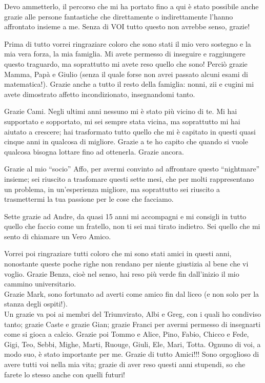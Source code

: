 
Devo ammetterlo, il percorso che mi ha portato fino a qui è stato possibile anche grazie alle persone fantastiche che direttamente o indirettamente l'hanno affrontato insieme a me. Senza di VOI tutto questo non avrebbe senso, grazie!

Prima di tutto vorrei ringraziare coloro che sono stati il mio vero sostegno e la mia vera forza, la mia famiglia. Mi avete permesso di inseguire e raggiungere questo traguardo, ma soprattutto mi avete reso quello che sono! Perciò grazie 
Mamma, Papà e Giulio (senza il quale forse non avrei passato alcuni esami di matematica!). Grazie anche a tutto il resto della famiglia: nonni, zii e cugini mi avete dimostrato affetto incondizionato, insegnandomi tanto.

Grazie Cami. Negli ultimi anni nessuno mi è stato più vicino di te. Mi hai supportato e sopportato, mi sei sempre stata vicina, ma soprattutto mi hai aiutato a crescere; hai trasformato tutto quello che mi è capitato in questi quasi cinque anni in qualcosa di migliore. Grazie a te ho capito che quando si vuole qualcosa bisogna lottare fino ad ottenerla. Grazie ancora.

Grazie al mio ``socio'' Affo, per avermi convinto ad affrontare questo ``nightmare'' insieme; sei riuscito a trasfomare questi sette mesi, che per molti rappresentano un problema, in un'esperienza migliore, ma soprattutto sei riuscito a trasmettermi la tua passione per le cose che facciamo.

Sette grazie ad Andre, da quasi 15 anni mi accompagni e mi consigli in tutto quello che faccio come un fratello, non ti sei mai tirato indietro. Sei quello che mi sento di chiamare un Vero Amico.

Vorrei poi ringraziare tutti coloro che mi sono stati amici in questi anni, nonostante queste poche righe non rendano per niente giustizia al bene che vi voglio. Grazie Benza, cioè nel senso, hai reso più verde fin dall'inizio il mio cammino universitario.\\ Grazie Mark, sono fortunato ad averti come amico fin dal liceo (e non solo per la stanza degli ospiti!).\\ Un grazie va poi ai membri del Triumvirato, Albi e Greg, con i quali ho condiviso tanto; grazie Caste e grazie Gian; grazie Franci per avermi permesso di insegnarti come si gioca a calcio. Grazie poi Tommo e Alice, Pino, Fabio, Chicco e Fede, Gigi, Teo, Sebbi, Mighe, Marti, Ruouge, Giuli, Ele, Mari, Totta. Ognuno di voi, a modo suo, è stato importante per me. Grazie di tutto Amici!!!
Sono orgoglioso di avere tutti voi nella mia vita; grazie di aver reso questi anni stupendi, so che farete lo stesso anche con quelli futuri!